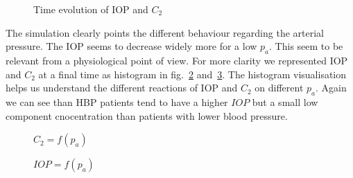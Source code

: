 \begin{figure}[htbp]
 \centering
 
  \caption[text1]{Time evolution of IOP and $C_2$ }
    \label{fig:tevolpc2}
\end{figure}
The simulation clearly points the different behaviour regarding the arterial pressure. The IOP seems to decrease widely more for a low $p_a$. This seem to be relevant from a physiological point of view. For more clarity we represented IOP and $C_2$ at a final time as histogram in fig.~\ref{fig:histc2} and~\ref{fig:histIOP}. The histogram visualisation helps us understand the different reactions of IOP and $C_2$ on different $p_a$. Again we can see than HBP patients tend to have a higher $IOP$ but a small low component cnocentration than patients with lower blood pressure.
\begin{figure}[h]

  \caption{$C_2 = f(p_a)$}
  \label{fig:histc2}
\end{figure}
\begin{figure}[h]

  \caption{$IOP = f(p_a)$}
  \label{fig:histIOP}
\end{figure}

